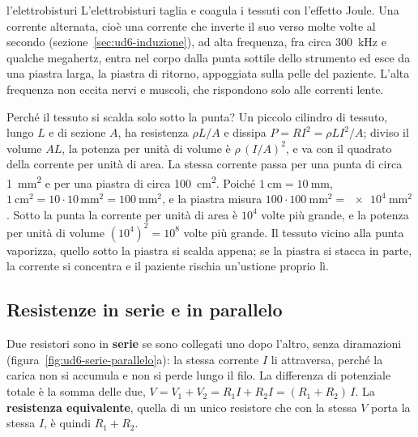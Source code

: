 \begin{applicazione}{l'elettrobisturi}
L'elettrobisturi taglia e coagula i tessuti con l'effetto Joule. Una corrente alternata, cioè una corrente che inverte il suo verso molte volte al secondo (sezione~\ref{sec:ud6-induzione}), ad alta frequenza, fra circa \SI{300}{\kilo\hertz} e qualche megahertz, entra nel corpo dalla punta sottile dello strumento ed esce da una piastra larga, la piastra di ritorno, appoggiata sulla pelle del paziente. L'alta frequenza non eccita nervi e muscoli, che rispondono solo alle correnti lente.

Perché il tessuto si scalda solo sotto la punta? Un piccolo cilindro di tessuto, lungo $L$ e di sezione $A$, ha resistenza $\rho L/A$ e dissipa $P = RI^{2} = \rho L I^{2}/A$; diviso il volume $AL$, la potenza per unità di volume è $\rho\,(I/A)^{2}$, e va con il quadrato della corrente per unità di area. La stessa corrente passa per una punta di circa \SI{1}{\milli\metre\squared} e per una piastra di circa \SI{100}{\centi\metre\squared}. Poiché $\SI{1}{\centi\metre} = \SI{10}{\milli\metre}$, $\SI{1}{\centi\metre\squared} = 10 \cdot 10\,\si{\milli\metre\squared} = \SI{100}{\milli\metre\squared}$, e la piastra misura $100 \cdot \SI{100}{\milli\metre\squared} = \SI{e4}{\milli\metre\squared}$. Sotto la punta la corrente per unità di area è $10^{4}$ volte più grande, e la potenza per unità di volume $(10^{4})^{2} = 10^{8}$ volte più grande. Il tessuto vicino alla punta vaporizza, quello sotto la piastra si scalda appena; se la piastra si stacca in parte, la corrente si concentra e il paziente rischia un'ustione proprio lì.
\end{applicazione}

\subsection{Resistenze in serie e in parallelo}

Due resistori sono in \textbf{serie} se sono collegati uno dopo l'altro, senza diramazioni (figura~\ref{fig:ud6-serie-parallelo}a): la stessa corrente $I$ li attraversa, perché la carica non si accumula e non si perde lungo il filo. La differenza di potenziale totale è la somma delle due, $V = V_1 + V_2 = R_1 I + R_2 I = (R_1 + R_2)\,I$. La \textbf{resistenza equivalente}, quella di un unico resistore che con la stessa $V$ porta la stessa $I$, è quindi $R_1 + R_2$.

